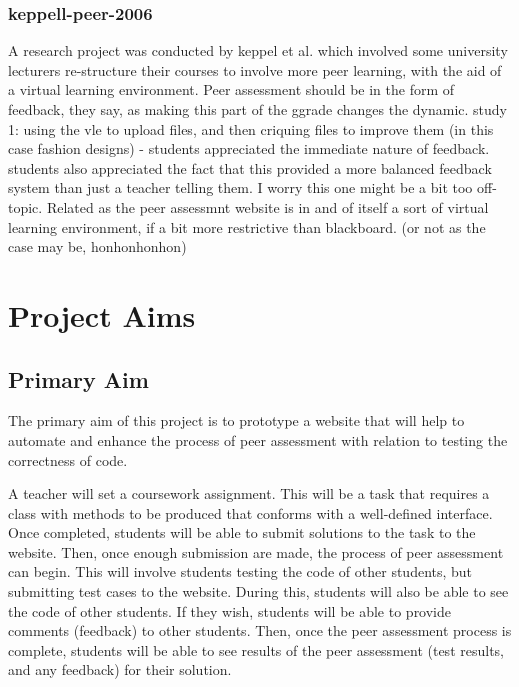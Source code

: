 \documentclass[a4paper,11pt]{report}
\begin{document}
\subsection{keppell-peer-2006}
A research project was conducted by keppel et al.\cite{keppell_peer_2006} which involved some university lecturers re-structure their courses to involve more peer learning, with the aid of a virtual learning environment. 
Peer assessment should be in the form of feedback, they say, as making this part of the ggrade changes the dynamic.
study 1: using the vle to upload files, and then criquing files to improve them (in this case fashion designs) - students appreciated the immediate nature of feedback. students also appreciated the fact that this provided a more balanced feedback system than just a teacher telling them. 
I worry this one might be a bit too off-topic.
Related as the peer assessmnt website is in and of itself a sort of virtual learning environment, if a bit more restrictive than blackboard. (or not as the case may be, honhonhonhon)


\chapter{Project Aims}
\section{Primary Aim}
The primary aim of this project is to prototype a website that will help to automate and enhance the process of peer assessment with relation to testing the correctness of code.\par
A teacher will set a coursework assignment. This will be a task that requires a class with methods to be produced that conforms with a well-defined interface. Once completed, students will be able to submit solutions to the task to the website. Then, once enough submission are made, the process of peer assessment can begin. This will involve students testing the code of other students, but submitting test cases to the website. During this, students will also be able to see the code of other students. If they wish, students will be able to provide comments (feedback) to other students. Then, once the peer assessment process is complete, students will be able to see results of the peer assessment (test results, and any feedback) for their solution.
\end{document}
